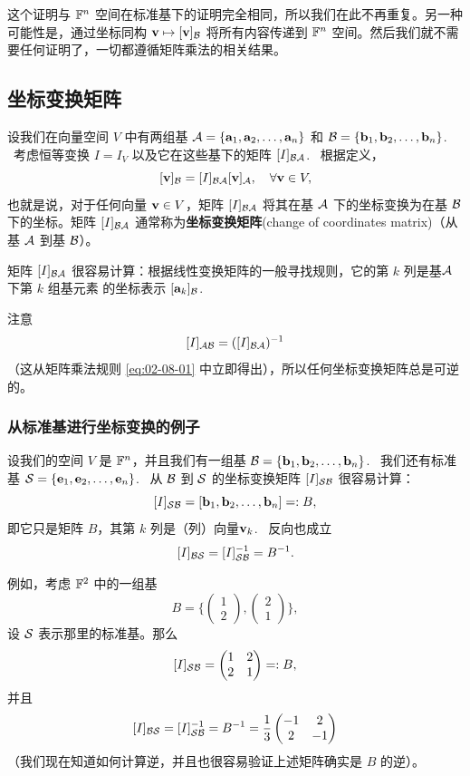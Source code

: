 这个证明与 $\mathbb{F}^n$ 空间在标准基下的证明完全相同，所以我们在此不再重复。另一种可能性是，通过坐标同构 $\mathbf{v} \mapsto [\mathbf{v}]_{\mathcal{B}}$ 将所有内容传递到 $\mathbb{F}^n$ 空间。然后我们就不需要任何证明了，一切都遵循矩阵乘法的相关结果。

\subsection{坐标变换矩阵}\label{sec:02-08-03}

设我们在向量空间 $V$ 中有两组基 $\mathcal{A} = \{\mathbf{a}_1, \mathbf{a}_2, \dots, \mathbf{a}_n\}$ 和 $\mathcal{B} = \{\mathbf{b}_1, \mathbf{b}_2, \dots, \mathbf{b}_n\}$. ~考虑恒等变换 $I = I_V$ 以及它在这些基下的矩阵 $[I]_{\mathcal{B}\mathcal{A}}$. ~根据定义，
$$[ \mathbf{v} ]_{\mathcal{B}} = [I]_{\mathcal{B}\mathcal{A}} [\mathbf{v}]_{\mathcal{A}}, \quad \forall \mathbf{v} \in V,$$
也就是说，对于任何向量 $\mathbf{v} \in V$，矩阵 $[I]_{\mathcal{B}\mathcal{A}}$ 将其在基 $\mathcal{A}$ 下的坐标变换为在基 $\mathcal{B}$ 下的坐标。矩阵 $[I]_{\mathcal{B}\mathcal{A}}$ 通常称为\textbf{坐标变换矩阵}(change of coordinates matrix)（从基 $\mathcal{A}$ 到基 $\mathcal{B}$）。

矩阵 $[I]_{\mathcal{B}\mathcal{A}}$ 很容易计算：根据线性变换矩阵的一般寻找规则，它的第 $k$ 列是基$\mathcal{A}$下第 $k$ 组基元素 的坐标表示 $[\mathbf{a}_k]_{\mathcal{B}}$. ~

注意 $$[I]_{\mathcal{A}\mathcal{B}} = ([I]_{\mathcal{B}\mathcal{A}})^{-1}$$（这从矩阵乘法规则 \eqref{eq:02-08-01} 中立即得出），所以任何坐标变换矩阵总是可逆的。

\subsubsection{从标准基进行坐标变换的例子}\label{sec:02-08-03-01}

设我们的空间 $V$ 是 $\mathbb{F}^n$，并且我们有一组基 $\mathcal{B} = \{\mathbf{b}_1, \mathbf{b}_2, \dots, \mathbf{b}_n\}$. ~我们还有标准基 $\mathcal{S} = \{\mathbf{e}_1, \mathbf{e}_2, \dots, \mathbf{e}_n\}$. ~从 $\mathcal{B}$ 到 $\mathcal{S}$ 的坐标变换矩阵 $[I]_{\mathcal{S}\mathcal{B}}$ 很容易计算：
$$[I]_{\mathcal{S}\mathcal{B}} = [\mathbf{b}_1, \mathbf{b}_2, \dots, \mathbf{b}_n] =: B,$$
即它只是矩阵 $B$，其第 $k$ 列是（列）向量$\mathbf{v}_k$. ~反向也成立 $$[I]_{\mathcal{B}\mathcal{S}} = [I]_{\mathcal{S}\mathcal{B}}^{-1} = B^{-1}.$$

例如，考虑 $\mathbb{F}^2$ 中的一组基
$$B = \{ \begin{pmatrix} 1 \\ 2 \end{pmatrix}, \begin{pmatrix} 2 \\ 1 \end{pmatrix} \},$$
设 $\mathcal{S}$ 表示那里的标准基。那么
$$[I]_{\mathcal{S}\mathcal{B}} = \begin{pmatrix} 1 & 2 \\ 2 & 1 \end{pmatrix} =: B,$$
并且
$$[I]_{\mathcal{B}\mathcal{S}} = [I]_{\mathcal{S}\mathcal{B}}^{-1} = B^{-1} = \frac{1}{3} \begin{pmatrix} -1 & 2 \\ 2 & -1 \end{pmatrix}$$
（我们现在知道如何计算逆，并且也很容易验证上述矩阵确实是 $B$ 的逆）。

